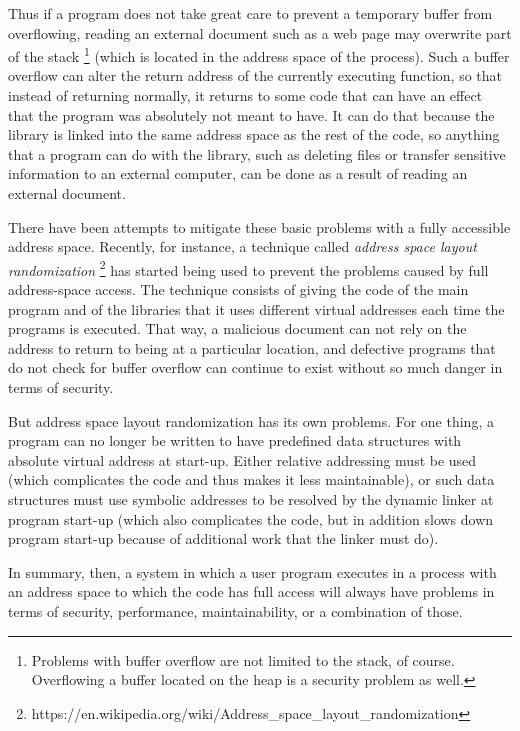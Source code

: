 Thus if a program does not take great care to prevent a temporary buffer
from overflowing, reading an external document such as a web page may
overwrite part of the stack%
\footnote{Problems with buffer overflow are not limited to the stack,
  of course.  Overflowing a buffer located on the heap is a security
  problem as well.}
(which is located in the address space of
the process).  Such a buffer overflow can alter the return address of
the currently executing function, so that instead of returning
normally, it returns to some code that can have an effect that the
program was absolutely not meant to have.  It can do that because the
\clanguage{} library is linked into the same address space as the rest
of the code, so anything that a program can do with the \clanguage{}
library, such as deleting files or transfer sensitive information to
an external computer, can be done as a result of reading an external
document.

There have been attempts to mitigate these basic problems with a
fully accessible address space.  Recently, for instance, a technique
called \emph{address space layout randomization}%
\footnote{https://en.wikipedia.org/wiki/Address\_space\_layout\_randomization}
has started being used to prevent the problems caused by full
address-space access.  The technique consists of giving the code of
the main program and of the libraries that it uses different virtual
addresses each time the programs is executed.  That way, a malicious
document can not rely on the address to return to being at a
particular location, and defective programs that do not check for
buffer overflow can continue to exist without so much danger in terms
of security.

But address space layout randomization has its own problems.  For one
thing, a program can no longer be written to have predefined data
structures with absolute virtual address at start-up.  Either relative
addressing must be used (which complicates the code and thus makes it
less maintainable), or such data structures must use symbolic
addresses to be resolved by the dynamic linker at program start-up
(which also complicates the code, but in addition slows down program
start-up because of additional work that the linker must do).

In summary, then, a system in which a user program executes in a
process with an address space to which the code has full access will
always have problems in terms of security, performance,
maintainability, or a combination of those.

